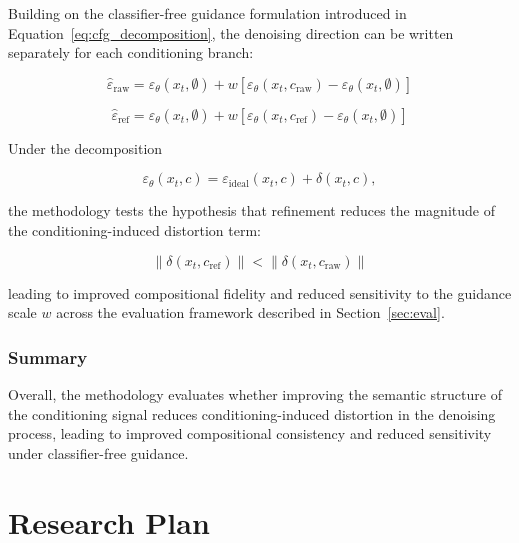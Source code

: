 \documentclass[a4paper,twoside,12pt]{report}
\begin{document}
Building on the classifier-free guidance formulation introduced in Equation~\ref{eq:cfg_decomposition}, the denoising direction can be written separately for each conditioning branch:

\begin{equation}
\hat{\varepsilon}_{\mathrm{raw}}
=
\varepsilon_\theta(x_t,\emptyset)
+
w
\left[
\varepsilon_\theta(x_t,c_{\mathrm{raw}})
-
\varepsilon_\theta(x_t,\emptyset)
\right]
\end{equation}

\begin{equation}
\hat{\varepsilon}_{\mathrm{ref}}
=
\varepsilon_\theta(x_t,\emptyset)
+
w
\left[
\varepsilon_\theta(x_t,c_{\mathrm{ref}})
-
\varepsilon_\theta(x_t,\emptyset)
\right]
\end{equation}

\noindent
Under the decomposition

\[
\varepsilon_\theta(x_t,c)
=
\varepsilon_{\mathrm{ideal}}(x_t,c)
+
\delta(x_t,c),
\]

\noindent
the methodology tests the hypothesis that refinement reduces the magnitude of the conditioning-induced distortion term:

\begin{equation}
\left\|
\delta\!\left(x_t,c_{\mathrm{ref}}\right)
\right\|
<
\left\|
\delta\!\left(x_t,c_{\mathrm{raw}}\right)
\right\|
\label{eq:hypothesis}
\end{equation}

\noindent
leading to improved compositional fidelity and reduced sensitivity to the guidance scale \(w\) across the evaluation framework described in Section~\ref{sec:eval}.


\subsection{Summary}

Overall, the methodology evaluates whether improving the semantic structure of the conditioning signal reduces conditioning-induced distortion in the denoising process, leading to improved compositional consistency and reduced sensitivity under classifier-free guidance.

\chapter{Research Plan}
\end{document}
